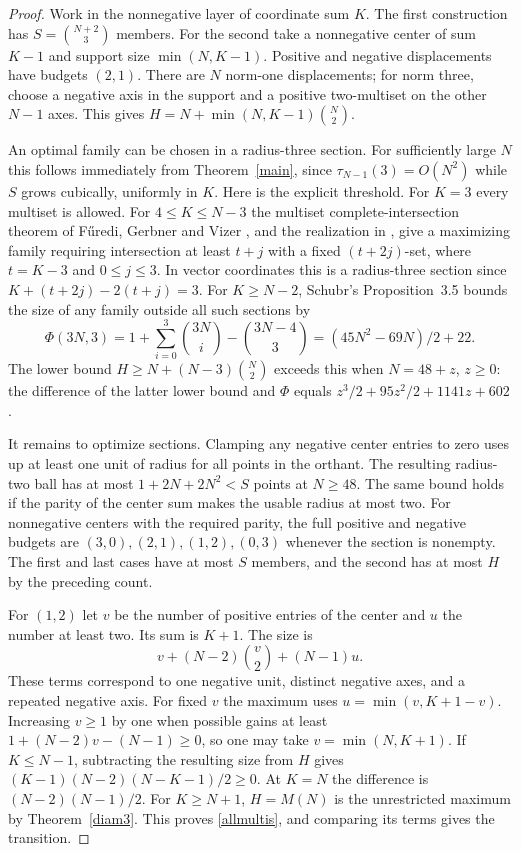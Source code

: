\documentclass[10pt]{article}
\begin{document}
\begin{proof}
Work in the nonnegative layer of coordinate sum $K$. The first construction has $S=\binom{N+2}3$ members. For the second take a nonnegative center of sum $K-1$ and support size $\min(N,K-1)$. Positive and negative displacements have budgets $(2,1)$. There are $N$ norm-one displacements; for norm three, choose a negative axis in the support and a positive two-multiset on the other $N-1$ axes. This gives $H=N+\min(N,K-1)\binom N2$.

An optimal family can be chosen in a radius-three section. For sufficiently large $N$ this follows immediately from Theorem~\ref{main}, since $\tau_{N-1}(3)=O(N^2)$ while $S$ grows cubically, uniformly in $K$. Here is the explicit threshold. For $K=3$ every multiset is allowed. For $4\le K\le N-3$ the multiset complete-intersection theorem of F\H{u}redi, Gerbner and Vizer \cite[Theorem 1.8]{fgv}, and the realization in \cite[Theorem 1.4 and the subsequent display]{mp}, give a maximizing family requiring intersection at least $t+j$ with a fixed $(t+2j)$-set, where $t=K-3$ and $0\le j\le3$. In vector coordinates this is a radius-three section since $K+(t+2j)-2(t+j)=3$. For $K\ge N-2$, Schubr's Proposition~3.5 \cite{schubr} bounds the size of any family outside all such sections by
\[
 \Phi(3N,3)=1+\sum_{i=0}^3\binom{3N}{i}-\binom{3N-4}3
           =(45N^2-69N)/2+22 .
\]
The lower bound $H\ge N+(N-3)\binom N2$ exceeds this when $N=48+z$, $z\ge0$: the difference of the latter lower bound and $\Phi$ equals $z^3/2+95z^2/2+1141z+602$.

It remains to optimize sections. Clamping any negative center entries to zero uses up at least one unit of radius for all points in the orthant. The resulting radius-two ball has at most $1+2N+2N^2<S$ points at $N\ge48$. The same bound holds if the parity of the center sum makes the usable radius at most two. For nonnegative centers with the required parity, the full positive and negative budgets are $(3,0),(2,1),(1,2),(0,3)$ whenever the section is nonempty. The first and last cases have at most $S$ members, and the second has at most $H$ by the preceding count.

For $(1,2)$ let $v$ be the number of positive entries of the center and $u$ the number at least two. Its sum is $K+1$. The size is
\[
 v+(N-2)\binom v2+(N-1)u .
\]
These terms correspond to one negative unit, distinct negative axes, and a repeated negative axis. For fixed $v$ the maximum uses $u=\min(v,K+1-v)$. Increasing $v\ge1$ by one when possible gains at least $1+(N-2)v-(N-1)\ge0$, so one may take $v=\min(N,K+1)$. If $K\le N-1$, subtracting the resulting size from $H$ gives $(K-1)(N-2)(N-K-1)/2\ge0$. At $K=N$ the difference is $(N-2)(N-1)/2$. For $K\ge N+1$, $H=M(N)$ is the unrestricted maximum by Theorem~\ref{diam3}. This proves \eqref{allmultis}, and comparing its terms gives the transition.
\end{proof}
\end{document}
